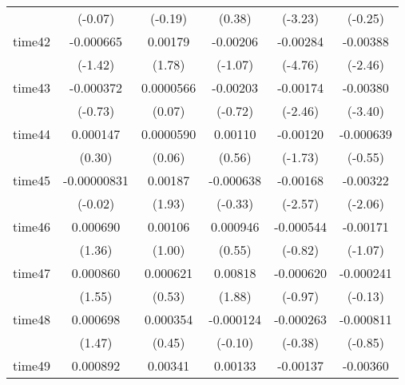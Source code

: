 \begin{table}[htbp]
\begin{tabular}{l*{5}{c}}
            &     (-0.07)         &     (-0.19)         &      (0.38)         &     (-3.23)         &     (-0.25)         \\
time42      &   -0.000665         &     0.00179         &    -0.00206         &    -0.00284\sym{***}&    -0.00388\sym{*}  \\
            &     (-1.42)         &      (1.78)         &     (-1.07)         &     (-4.76)         &     (-2.46)         \\
time43      &   -0.000372         &   0.0000566         &    -0.00203         &    -0.00174\sym{*}  &    -0.00380\sym{***}\\
            &     (-0.73)         &      (0.07)         &     (-0.72)         &     (-2.46)         &     (-3.40)         \\
time44      &    0.000147         &   0.0000590         &     0.00110         &    -0.00120         &   -0.000639         \\
            &      (0.30)         &      (0.06)         &      (0.56)         &     (-1.73)         &     (-0.55)         \\
time45      & -0.00000831         &     0.00187         &   -0.000638         &    -0.00168\sym{*}  &    -0.00322\sym{*}  \\
            &     (-0.02)         &      (1.93)         &     (-0.33)         &     (-2.57)         &     (-2.06)         \\
time46      &    0.000690         &     0.00106         &    0.000946         &   -0.000544         &    -0.00171         \\
            &      (1.36)         &      (1.00)         &      (0.55)         &     (-0.82)         &     (-1.07)         \\
time47      &    0.000860         &    0.000621         &     0.00818         &   -0.000620         &   -0.000241         \\
            &      (1.55)         &      (0.53)         &      (1.88)         &     (-0.97)         &     (-0.13)         \\
time48      &    0.000698         &    0.000354         &   -0.000124         &   -0.000263         &   -0.000811         \\
            &      (1.47)         &      (0.45)         &     (-0.10)         &     (-0.38)         &     (-0.85)         \\
time49      &    0.000892         &     0.00341\sym{*}  &     0.00133         &    -0.00137         &    -0.00360         \\

\end{tabular}
\end{table}
